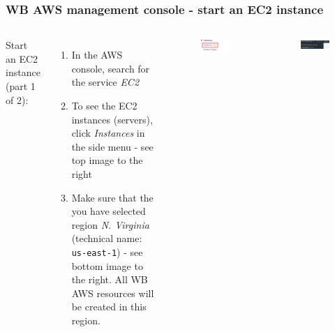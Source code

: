 \documentclass[aspectratio=169]{beamer} %
\begin{document}
\begin{frame}
	\frametitle{WB AWS management console - start an EC2 instance}

	\begin{columns}[c]


			Start an EC2 instance (part 1 of 2):
	
			\begin{enumerate}
				\item In the AWS console, search for the service \textit{EC2} 
				\item To see the EC2 instances (servers), 
				click \textit{Instances} in the side menu - see top image to the right 
				\item Make sure that the you have selected region \textit{N. Virginia} (technical name: \texttt{us-east-1}) - see bottom image to the right. All WB AWS resources will be created in this region.
			\end{enumerate}


			\begin{figure}
				\centering
				\includegraphics[width=.7\textwidth]{./img/ec2-1.png}
			\end{figure}		
			
			\begin{figure}
				\centering
				\includegraphics[width=.8\textwidth]{./img/aws-console-1.png}
			\end{figure}
	\end{columns}
\end{frame}
\end{document}
